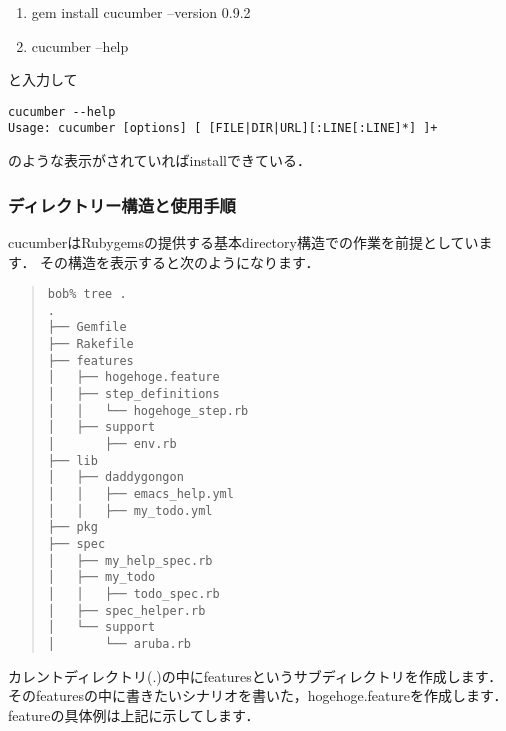 \begin{enumerate}
\item gem install cucumber --version 0.9.2
\item cucumber --help
\end{enumerate}
と入力して
\begin{lstlisting}[style=customCsh,basicstyle={\scriptsize\ttfamily}]
cucumber --help
Usage: cucumber [options] [ [FILE|DIR|URL][:LINE[:LINE]*] ]+
\end{lstlisting}
のような表示がされていればinstallできている．

\subsubsection{ディレクトリー構造と使用手順}
cucumberはRubygemsの提供する基本directory構造での作業を前提としています．
その構造を表示すると次のようになります．
\begin{quote}\begin{verbatim}
bob% tree .
.
├── Gemfile
├── Rakefile
├── features
│   ├── hogehoge.feature
│   ├── step_definitions
│   │   └── hogehoge_step.rb
│   ├── support
│       ├── env.rb
├── lib
│   ├── daddygongon
│   │   ├── emacs_help.yml
│   │   ├── my_todo.yml
├── pkg
├── spec
│   ├── my_help_spec.rb
│   ├── my_todo
│   │   ├── todo_spec.rb
│   ├── spec_helper.rb
│   └── support
│       └── aruba.rb
\end{verbatim}\end{quote}
カレントディレクトリ(.)の中にfeaturesというサブディレクトリを作成します．
そのfeaturesの中に書きたいシナリオを書いた，hogehoge.featureを作成します．
featureの具体例は上記に示してします．

